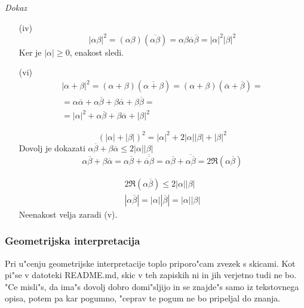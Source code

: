\emph{Dokaz}
\begin{itemize}
	\item[(iv)]
	\begin{equation*}
		|\alpha \beta|^2 = (\alpha \beta)(\overline{\alpha \beta}) = \alpha \beta \overline{\alpha} \overline{\beta} = |\alpha|^2 |\beta|^2
	\end{equation*}
	Ker je $|\alpha| \geq 0$, enakost sledi.
	
	\item[(vi)]
	\begin{multline*}
		|\alpha + \beta|^2 = (\alpha + \beta)(\overline{\alpha + \beta}) = (\alpha + \beta)(\overline{\alpha} + \overline{\beta}) = \\
		= \alpha \overline{\alpha} + \alpha \overline{\beta} + \beta \overline{\alpha} + \beta \overline{\beta} = \\
		= |\alpha|^2 + \alpha \overline{\beta} + \beta \overline{\alpha} + |\beta|^2
	\end{multline*}
	
	\begin{equation*}
		(|\alpha| + |\beta|)^2 = |\alpha|^2 + 2|\alpha||\beta| + |\beta|^2
	\end{equation*}
	Dovolj je dokazati $\alpha \overline{\beta} + \beta \overline{\alpha} \leq 2|\alpha||\beta|$
	\begin{equation*}
	\alpha \overline{\beta} + \beta \overline{\alpha} = \alpha \overline{\beta} + \overline{\overline{\overline{\alpha}\beta}} =
	\alpha \overline{\beta} + \overline{\alpha \overline{\beta}} = 2\Re (\alpha \overline{\beta})
	\end{equation*}
	
	\begin{gather*}
	2\Re(\alpha \overline{\beta}) \leq 2 |\alpha||\beta|\\
	|\alpha \overline{\beta}| = |\alpha||\overline{\beta}| = |\alpha||\beta|
	\end{gather*}
	Neenakost velja zaradi (v).
\end{itemize}


\subsubsection{Geometrijska interpretacija}
Pri u"cenju geometrijske interpretacije toplo priporo"cam zvezek s skicami. Kot pi"se v datoteki README.md, skic v teh zapiskih ni in jih verjetno tudi ne bo. "Ce misli"s, da ima"s dovolj dobro domi"sljijo in se znajde"s samo iz tekstovnega opisa, potem pa kar pogumno, "ceprav te pogum ne bo pripeljal do znanja.

